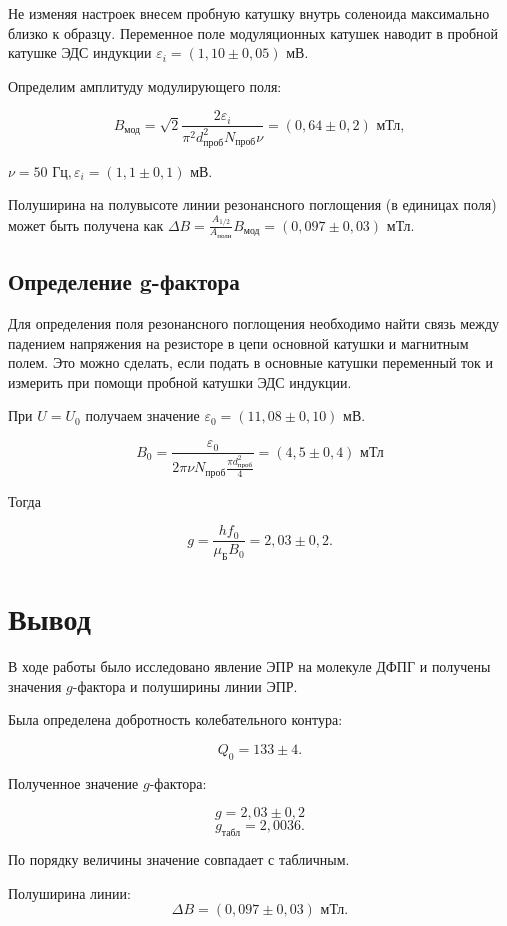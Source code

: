 \documentclass[a4paper,12pt]{article} %
\begin{document}
\medskip

\noindent Не изменяя настроек внесем пробную катушку внутрь соленоида максимально близко к образцу. Переменное поле модуляционных катушек наводит в пробной катушке ЭДС индукции $\varepsilon_i = (1,10 \pm 0,05) \text{ мВ}.$

\medskip

\noindent Определим амплитуду модулирующего поля:

$$B_\text{мод} = \sqrt{2} \frac{2 \varepsilon_i}{\pi^2 d_{\text{проб}}^2 N_{\text{проб}} \nu} = (0,64 \pm 0,2) \text{ мТл},$$

\noindent $\nu = 50 \text{ Гц}, \varepsilon_i = (1,1 \pm 0,1) \text { мВ}.$

\noindent Полуширина на полувысоте линии резонансного поглощения (в единицах поля) может быть получена как $\Delta B = \frac{A_{1/2}}{A_{\text{полн}}} B_{\text{мод}} = (0,097 \pm 0,03) \text{ мТл}.$

\subsection{Определение g-фактора}

\noindent Для определения поля резонансного поглощения необходимо найти связь между падением
напряжения на резисторе в цепи основной катушки и магнитным полем. Это можно сделать,
если подать в основные катушки переменный ток и измерить при помощи пробной катушки
ЭДС индукции.

\medskip

\noindent При $U = U_0$ получаем значение $\varepsilon_0 = (11,08 \pm 0,10) \text{ мВ}. $

$$ B_0 = \frac{\varepsilon_0}{2 \pi \nu N_{\text{проб}} \frac{\pi d_{\text{проб}}^2}{4}} = (4,5 \pm 0,4) \text{ мТл} $$

\noindent Тогда

$$ g = \frac{h f_0}{\mu_{\text{Б}} B_0}= 2,03 \pm 0,2.$$

\section{Вывод}

\noindent В ходе работы было исследовано явление ЭПР на молекуле ДФПГ и получены значения $g$-фактора и полуширины линии ЭПР. 

\medskip

\noindent Была определена добротность колебательного контура:

$$Q_0 = 133 \pm 4.$$

\noindent Полученное значение $g$-фактора:

 $$g = 2,03 \pm 0,2$$
 $$g_{\text{табл}} = 2,0036.$$
 
\noindent По порядку величины значение совпадает с табличным.

\medskip
 
\noindent Полуширина линии: 
$$\Delta B = (0,097 \pm 0,03) \text{ мТл}.$$ 
\end{document}

